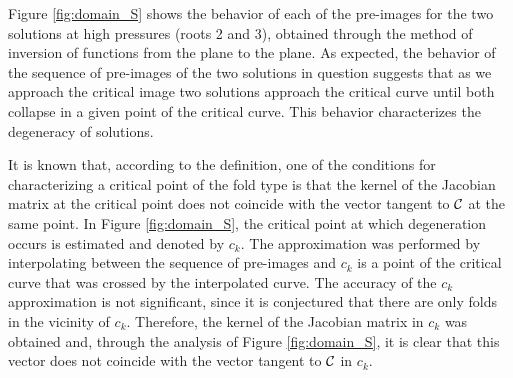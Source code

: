 \documentclass[journal=iecred,manuscript=article]{achemso}
\theoremstyle{definition}
\theoremstyle{remark}
\begin{document}
Figure \ref{fig:domain_S} shows the behavior of each of the pre-images for the two solutions at high pressures (roots 2 and 3), obtained through the method of inversion of functions from the plane to the plane. As expected, the behavior of the sequence of pre-images of the two solutions in question suggests that as we approach the critical image two solutions approach the critical curve until both collapse in a given point of the critical curve. This behavior characterizes the degeneracy of solutions.

It is known that, according to the definition, one of the conditions for characterizing a critical point of the fold type is that the kernel of the Jacobian matrix at the critical point does not coincide with the vector tangent to $ {\cal{C}} $ at the same point. In Figure \ref{fig:domain_S}, the critical point at which degeneration occurs is estimated and denoted by $ c_{k} $. The approximation was performed by interpolating between the sequence of pre-images and $ c_{k} $ is a point of the critical curve that was crossed by the interpolated curve. The accuracy of the $ c_{k} $ approximation is not significant, since it is conjectured that there are only folds in the vicinity of $ c_{k} $. Therefore, the kernel of the Jacobian matrix in $ c_{k} $ was obtained and, through the analysis of Figure \ref{fig:domain_S}, it is clear that this vector does not coincide with the vector tangent to $ {\cal{C}} $ in $ c_{k} $.
\end{document}
